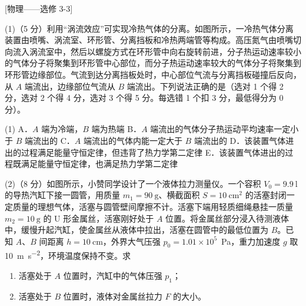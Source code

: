 \begin{question}
[物理——选修 3-3]

(1)（5 分）利用“涡流效应”可实现冷热气体的分离。如图所示，一冷热气体分离装置由喷嘴、涡流室、环形管、分离挡板和冷热两端管等构成。高压氮气由喷嘴切向流入涡流室中，然后以螺旋方式在环形管中向右旋转前进，分子热运动速率较小的气体分子将聚集到环形管中心部位，而分子热运动速率较大的气体分子将聚集到环形管边缘部位。气流到达分离挡板处时，中心部位气流与分离挡板碰撞后反向，从 $A$ 端流出，边缘部位气流从 $B$ 端流出。下列说法正确的是\gkblank（选对 1 个得 2 分，选对 2 个得 4 分，选对 3 个得 5 分。每选错 1 个扣 3 分，最低得分为 0 分）。


\begin{gkopts}(1)
  \task A．$A$ 端为冷端，$B$ 端为热端
  \task B．$A$ 端流出的气体分子热运动平均速率一定小于 $B$ 端流出的
  \task C．$A$ 端流出的气体内能一定大于 $B$ 端流出的
  \task D．该装置气体进出的过程满足能量守恒定律，但违背了热力学第二定律
  \task E．该装置气体进出的过程既满足能量守恒定律，也满足热力学第二定律
\end{gkopts}

(2)（8 分）如图所示，小赞同学设计了一个液体拉力测量仪。一个容积 $V_{0}=\SI{9.9}{\litre}$ 的导热汽缸下接一圆管，用质量 $m_{1}=\SI{90}{\gram}$、横截面积 $S=\SI{10}{\centi\metre\squared}$ 的活塞封闭一定质量的理想气体，活塞与圆管壁间摩擦不计。活塞下端用轻质细绳悬挂一质量 $m_{2}=\SI{10}{\gram}$ 的 U 形金属丝，活塞刚好处于 $A$ 位置。将金属丝部分浸入待测液体中，缓慢升起汽缸，使金属丝从液体中拉出，活塞在圆管中的最低位置为 $B$。已知 $A$、$B$ 间距离 $h=\SI{10}{\centi\metre}$，外界大气压强 $p_{0}=1.01\times10^{5}$~\si{\pascal}，重力加速度 $g$ 取 \SI{10}{\metre\per\second\squared}，环境温度保持不变。求


\begin{enumerate}[leftmargin=2em, label=(\roman*)]
  \item 活塞处于 $A$ 位置时，汽缸中的气体压强 $p_{1}$；
  \item 活塞处于 $B$ 位置时，液体对金属丝拉力 $F$ 的大小。
\end{enumerate}
\end{question}


